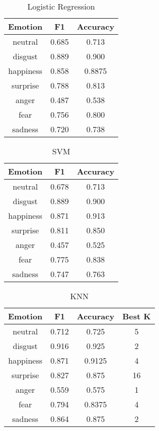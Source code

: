 \begin{table}[t]
\caption{Logistic Regression}
\label{table:logistic}
\centering
\begin{tabular}{|c|c|c|}
\hline
\textbf{Emotion} &  \textbf{F1} &  \textbf{Accuracy} \\ \hline \hline
neutral & 0.685 & 0.713 \\ \hline
disgust & 0.889 & 0.900 \\ \hline
happiness & 0.858 & 0.8875 \\ \hline
surprise & 0.788 & 0.813 \\ \hline
anger & 0.487 & 0.538 \\ \hline
fear & 0.756 & 0.800 \\ \hline
sadness & 0.720 & 0.738 \\ \hline
\end{tabular}
\end{table}

\begin{table}[t]
\caption{SVM}
\label{table:svm}
\centering
\begin{tabular}{|c|c|c|}
\hline
\textbf{Emotion} &  \textbf{F1} &  \textbf{Accuracy} \\ \hline \hline
neutral& 0.678 & 0.713  \\ \hline
disgust& 0.889 & 0.900 \\ \hline
happiness& 0.871 & 0.913 \\ \hline
surprise& 0.811& 0.850 \\ \hline
anger& 0.457& 0.525 \\ \hline
fear& 0.775 & 0.838 \\ \hline
sadness& 0.747 & 0.763 \\ \hline
\end{tabular}
\end{table}

\begin{table}[t]
\caption{KNN}
\label{table:knn}
\centering
    \begin{tabular}{|c|c|c|c|}
\hline
\textbf{Emotion} &  \textbf{F1} &  \textbf{Accuracy} & \textbf{Best K}\\ \hline \hline
neutral& 0.712& 0.725& 5 \\ \hline
disgust& 0.916& 0.925& 2 \\ \hline
happiness& 0.871& 0.9125& 4 \\ \hline
surprise& 0.827& 0.875& 16 \\ \hline
anger& 0.559& 0.575& 1 \\ \hline
fear& 0.794& 0.8375& 4 \\ \hline
sadness& 0.864& 0.875& 2 \\ \hline
\end{tabular}
\end{table}
